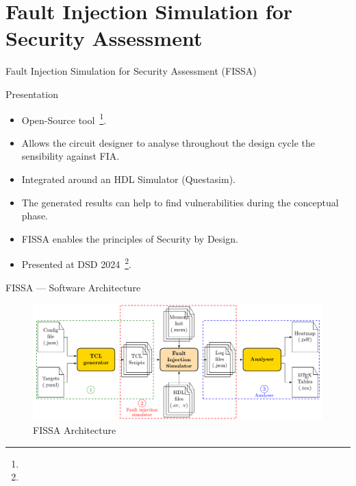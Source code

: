 \section{Fault Injection Simulation for Security Assessment}

\begin{frame}{Fault Injection Simulation for Security Assessment (FISSA)}
    \begin{block}{Presentation}
        \begin{itemize}
            \item Open-Source tool~\footnote[frame]{\tiny{}}.
            \item Allows the circuit designer to analyse throughout the design cycle the sensibility against FIA.
            \item Integrated around an HDL Simulator (Questasim).
            \item The generated results can help to find vulnerabilities during the conceptual phase.
            \item FISSA enables the principles of Security by Design.
            \item Presented at DSD 2024~\footnote[frame]{\tiny{}}.
        \end{itemize}
    \end{block}
\end{frame}

\begin{frame}{FISSA — Software Architecture}
    \begin{figure}
        \centering
        \includegraphics[width=.9\textwidth, page=2]{src/3_fissa/img/fissa/archi_fissa.pdf}
        \caption{FISSA Architecture}
        \label{fig:archiSoft}
    \end{figure}
\end{frame}

